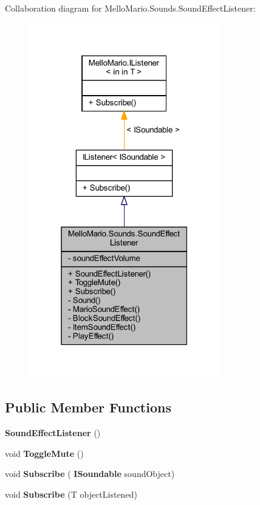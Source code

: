 Collaboration diagram for Mello\+Mario.\+Sounds.\+Sound\+Effect\+Listener\+:
\nopagebreak
\begin{figure}[H]
\begin{center}
\leavevmode
\includegraphics[width=235pt]{classMelloMario_1_1Sounds_1_1SoundEffectListener__coll__graph}
\end{center}
\end{figure}
\subsection*{Public Member Functions}
\begin{DoxyCompactItemize}
\item 
\textbf{ Sound\+Effect\+Listener} ()
\item 
void \textbf{ Toggle\+Mute} ()
\item 
void \textbf{ Subscribe} (\textbf{ I\+Soundable} sound\+Object)
\item 
void \textbf{ Subscribe} (T object\+Listened)
\end{DoxyCompactItemize}
